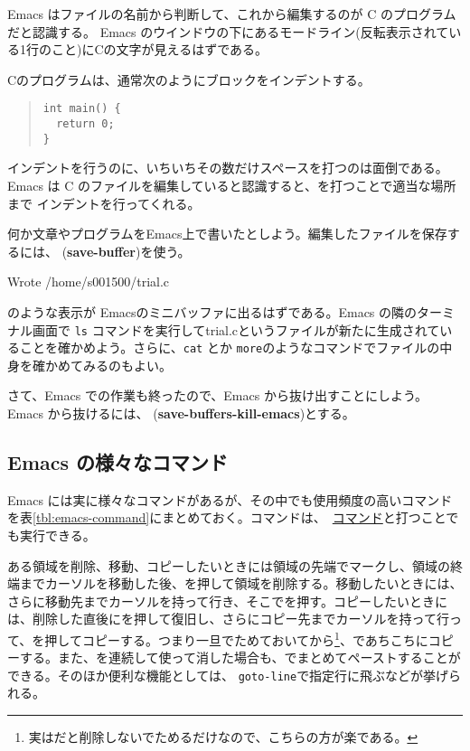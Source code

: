 Emacs はファイルの名前から判断して、これから編集するのが C のプログラムだと認識する。
Emacs のウインドウの下にあるモードライン(反転表示されている1行のこと)にCの文字が見えるはずである。

Cのプログラムは、通常次のようにブロックをインデントする。
\begin{quote}
\begin{verbatim}
int main() {
  return 0;
}
\end{verbatim}
\end{quote}
インデントを行うのに、いちいちその数だけスペースを打つのは面倒である。Emacs は C のファイルを編集していると認識すると、を打つことで適当な場所まで
インデントを行ってくれる。

何か文章やプログラムをEmacs上で書いたとしよう。編集したファイルを保存するには、  ({\bf save-buffer})を使う。
\begin{commandline2}
Wrote /home/s001500/trial.c
\end{commandline2} \noindent
のような表示が Emacsのミニバッファに出るはずである。Emacs の隣のターミナル画面で {\tt ls} コマンドを実行してtrial.cというファイルが新たに生成されていることを確かめよう。さらに、{\tt cat} とか {\tt more}のようなコマンドでファイルの中身を確かめてみるのもよい。

さて、Emacs での作業も終ったので、Emacs から抜け出すことにしよう。Emacs から抜けるには、  ({\bf save-buffers-kill-emacs})とする。

\subsection{Emacs の様々なコマンド}
Emacs には実に様々なコマンドがあるが、その中でも使用頻度の高いコマンドを表\ref{tbl:emacs-command}にまとめておく。コマンドは、\ \underline{コマンド}と打つことでも実行できる。

ある領域を削除、移動、コピーしたいときには領域の先端でマークし、領域の終端までカーソルを移動した後、を押して領域を削除する。移動したいときには、さらに移動先までカーソルを持って行き、そこでを押す。コピーしたいときには、削除した直後にを押して復旧し、さらにコピー先までカーソルを持って行って、を押してコピーする。つまり一旦でためておいてから\footnote{実はだと削除しないでためるだけなので、こちらの方が楽である。}、であちこちにコピーする。また、を連続して使って消した場合も、でまとめてペーストすることができる。そのほか便利な機能としては、 {\tt goto-line}で指定行に飛ぶなどが挙げられる。


